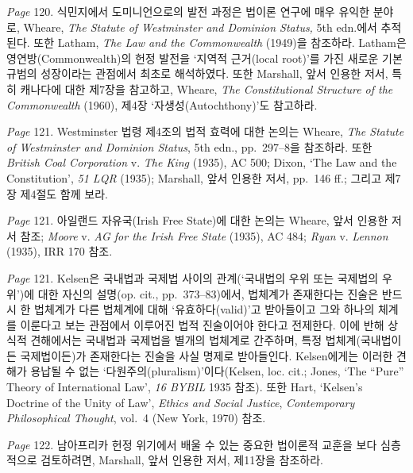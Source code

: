 {\emph{Page} 120.  식민지에서 도미니언으로의 발전 과정은 법이론 연구에 매우
유익한 분야로, Wheare, \emph{The Statute of Westminster and Dominion
Status,} 5th edn.에서 추적된다. 또한 Latham, \emph{The Law and the
Commonwealth} (1949)을 참조하라. Latham은 영연방(Commonwealth)의 헌정
발전을 `지역적 근거(local root)'를 가진 새로운 기본 규범의 성장이라는
관점에서 최초로 해석하였다. 또한 Marshall, 앞서 인용한 저서, 특히
캐나다에 대한 제7장을 참고하고, Wheare, \emph{The Constitutional
Structure of the Commonwealth} (1960), 제4장 `자생성(Autochthony)'도
참고하라.

\emph{Page} 121.  Westminster 법령 제4조의 법적 효력에 대한 논의는 Wheare,
\emph{The Statute of Westminster and Dominion Status}, 5th edn.,
pp.~297--8을 참조하라. 또한 \emph{British Coal Corporation} v. \emph{The
King} (1935), AC 500; Dixon, `The Law and the Constitution', \emph{51
LQR} (1935); Marshall, 앞서 인용한 저서, pp.~146 ff.; 그리고 제7장
제4절도 함께 보라.

\emph{Page} 121.  아일랜드 자유국(Irish Free
State)에 대한 논의는 Wheare, 앞서 인용한 저서 참조; \emph{Moore} v.
\emph{AG for the Irish Free State} (1935), AC 484; \emph{Ryan} v.
\emph{Lennon} (1935), IRR 170 참조.

\emph{Page} 121.  Kelsen은 국내법과 국제법 사이의 관계(`국내법의 우위
또는 국제법의 우위')에 대한 자신의 설명(op. cit., pp.~373--83)에서,
법체계가 존재한다는 진술은 반드시 한 법체계가 다른 법체계에 대해
`유효하다(valid)'고 받아들이고 그와 하나의 체계를 이룬다고 보는 관점에서
이루어진 법적 진술이어야 한다고 전제한다. 이에 반해 상식적 견해에서는
국내법과 국제법을 별개의 법체계로 간주하며, 특정 법체계(국내법이든
국제법이든)가 존재한다는 진술을 사실 명제로 받아들인다. Kelsen에게는
이러한 견해가 용납될 수 없는 `다원주의(pluralism)'이다(Kelsen, loc.
cit.; Jones, `The ``Pure'' Theory of International Law', \emph{16 BYBIL}
1935 참조). 또한 Hart, `Kelsen's Doctrine of the Unity of Law',
\emph{Ethics and Social Justice}, \emph{Contemporary Philosophical
Thought}, vol.~4 (New York, 1970) 참조.

\emph{Page} 122.  남아프리카 헌정
위기에서 배울 수 있는 중요한 법이론적 교훈을 보다 심층적으로 검토하려면,
Marshall, 앞서 인용한 저서, 제11장을 참조하라.

}
